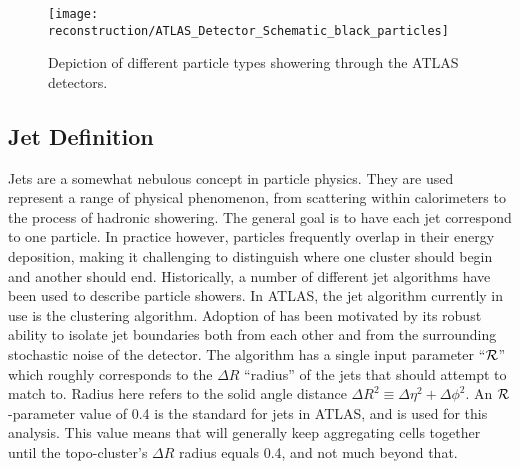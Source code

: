         \begin{figure}[tbh]
            \texttt{[image: reconstruction/ATLAS\_Detector\_Schematic\_black\_particles]}
            \caption{
                Depiction of different particle types showering through the ATLAS detectors\cite{Mehlhase:2770815}.
            }
            \label{fig:atlas_shower}
        \end{figure}


        \subsection{Jet Definition}
            
        Jets are a somewhat nebulous concept in particle physics.
        They are used represent a range of physical phenomenon,
            from scattering within calorimeters to the process of hadronic showering.
        The general goal is to have each jet correspond to one particle.
        In practice however, particles frequently overlap in their energy deposition,
            making it challenging to distinguish where one cluster should begin and another should end.
        Historically, a number of different jet algorithms have been used to describe particle showers.
        In ATLAS, the jet algorithm currently in use is the \textit{\antikt} clustering algorithm\cite{anti_kt}.
        Adoption of \antikt has been motivated by its robust ability to isolate jet boundaries both from each other
            and from the surrounding stochastic noise of the detector.
        The \antikt algorithm has a single input parameter ``$\mathcal{R}$'' which roughly corresponds to the $\Delta R$ ``radius''
            of the jets that \antikt should attempt to match to.
        Radius here refers to the solid angle distance 
            $\Delta R^2 \equiv \Delta \eta^2 + \Delta \phi^2$.
        An $\mathcal{R}$-parameter value of 0.4 is the standard for jets in ATLAS, and is used for this analysis.
        This value means that \antikt will generally keep aggregating cells together until the topo-cluster's
            $\Delta R$ radius equals 0.4, and not much beyond that.


